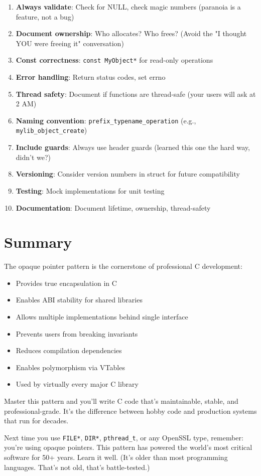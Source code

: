 \begin{enumerate}
    \item \textbf{Always validate}: Check for NULL, check magic numbers (paranoia is a feature, not a bug)
    \item \textbf{Document ownership}: Who allocates? Who frees? (Avoid the "I thought YOU were freeing it" conversation)
    \item \textbf{Const correctness}: \texttt{const MyObject*} for read-only operations
    \item \textbf{Error handling}: Return status codes, set errno
    \item \textbf{Thread safety}: Document if functions are thread-safe (your users will ask at 2 AM)
    \item \textbf{Naming convention}: \texttt{prefix\_typename\_operation} (e.g., \texttt{mylib\_object\_create})
    \item \textbf{Include guards}: Always use header guards (learned this one the hard way, didn't we?)
    \item \textbf{Versioning}: Consider version numbers in struct for future compatibility
    \item \textbf{Testing}: Mock implementations for unit testing
    \item \textbf{Documentation}: Document lifetime, ownership, thread-safety
\end{enumerate}

\section{Summary}

The opaque pointer pattern is the cornerstone of professional C development:

\begin{itemize}
    \item Provides true encapsulation in C
    \item Enables ABI stability for shared libraries
    \item Allows multiple implementations behind single interface
    \item Prevents users from breaking invariants
    \item Reduces compilation dependencies
    \item Enables polymorphism via VTables
    \item Used by virtually every major C library
\end{itemize}

Master this pattern and you'll write C code that's maintainable, stable, and professional-grade. It's the difference between hobby code and production systems that run for decades.

\begin{tipbox}
Next time you use \texttt{FILE*}, \texttt{DIR*}, \texttt{pthread\_t}, or any OpenSSL type, remember: you're using opaque pointers. This pattern has powered the world's most critical software for 50+ years. Learn it well. (It's older than most programming languages. That's not old, that's battle-tested.)
\end{tipbox}
